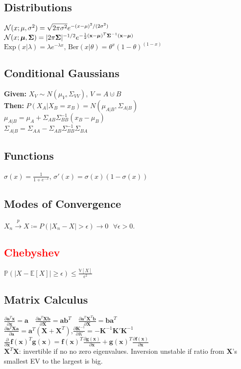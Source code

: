 \subsection*{Distributions}
$\mathcal{N}(x;\mu, \sigma^2)=\sqrt{2\pi\sigma^2}e^{-(x-\mu)^2/(2\sigma^2)}$\\
$\mathcal{N}(x;\bm{\mu}, \bm{\Sigma})= |2\pi\bm{\Sigma}|^{-1/2} e^{-\frac{1}{2}(\mathbf{x}-\bm{\mu})^T\bm{\Sigma}^{-1}(\mathbf{x}-\bm{\mu})} $\\
$\mathrm{Exp}(x|\lambda){=}\lambda e^{-\lambda x}$, $\mathrm{Ber}(x|\theta){=}\theta^x (1{-}\theta)^{(1-x)}$

\subsection*{Conditional Gaussians}
\textbf{Given:} $X_V \sim N(\mu_V, \Sigma_{VV})$, $V=A\cupdot B$\\
\textbf{Then:} $P(X_A|X_B=x_B)=N(\mu_{A|B}, \Sigma_{A|B})$\\
$\mu_{A|B}=\mu_A+\Sigma_{AB}\Sigma^{-1}_{BB}(x_B-\mu_B)$\\
$\Sigma_{A|B}=\Sigma_{AA}-\Sigma_{AB}\Sigma^{-1}_{BB}\Sigma_{BA}$

\subsection*{Functions}
$\sigma(x)=\frac{1}{1+e^{-x}}$, $\sigma'(x)=\sigma(x)(1-\sigma(x))$

\subsection*{Modes of Convergence}
$X_n \overset{p}{\to} X \coloneqq P(|X_n-X|>\epsilon){\to} 0 \,\,\,\,\forall \epsilon > 0$.

\subsection*{\textcolor{red}{Chebyshev}}
$\mathbb{P}(|X-\mathbb{E}[X]|\geq \epsilon)\leq \frac{\mathbb{V}[X]}{\epsilon^2}$\\

\subsection*{Matrix Calculus}
$\frac{\partial \mathbf{a}^T\mathbf{x}}{\partial\mathbf{x}}{=}\mathbf{a} \quad \frac{\partial \mathbf{a}^T\mathbf{Xb}}{\partial\mathbf{X}}{=}\mathbf{ab}^T \quad \frac{\partial \mathbf{a}^T\mathbf{X}^T\mathbf{b}}{\partial\mathbf{X}}{=}\mathbf{ba}^T $\\
$\frac{\partial \mathbf{a}^T\mathbf{Xa}}{\partial\mathbf{a}}{=}\mathbf{a}^T(\mathbf{X}+\mathbf{X}^T)$,$\frac{\partial \mathbf{K}^{-1}}{\partial K}=-\mathbf{K}^{-1}\mathbf{K}'\mathbf{K}^{-1}$\\
 $\frac{\partial}{\partial\mathbf{x}} \mathbf{f(x)}^T\mathbf{g(x)}{=}\mathbf{f(x)}^T\frac{\partial \mathbf{g(x)}}{\partial\mathbf{x}}+\mathbf{g(x)}^T\frac{\partial\mathbf{f(x)}}{\partial\mathbf{x}}$\\
$\mathbf{X}^T\mathbf{X}$: invertible if no no zero eigenvalues.
Inversion unstable if ratio from $\mathbf{X}$'s smallest EV to the largest is big.


